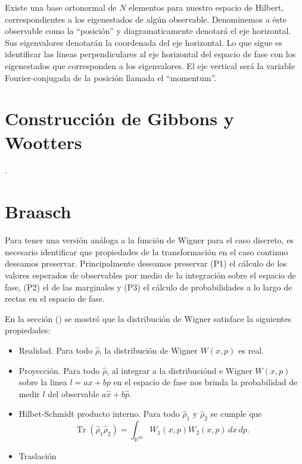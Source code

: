 \documentclass[a4paper]{report}
\DeclareMathOperator{\R}{\mathbb{R}}
\DeclareMathOperator{\Tr}{Tr}
\begin{document}
  Existe una base ortonormal de $N$ elementos para nuestro
  espacio de Hilbert, correspondientes a los eigenestados de
  algún observable. Denominemos a éste observable como la
  ``posición'' y diagramaticamente denotará el eje
  horizontal. Sus eigenvalores denotarán la coordenada del
  eje horizontal. Lo que sigue es identificar las lineas
  perpendiculares al eje horizontal del espacio de fase con
  los eigenestados que corresponden a los eigenvalores. El
  eje vertical será la variable Fourier-conjugada de la
  posición llamada el ``momentum''.

  \section{Construcción de Gibbons y Wootters}

  .

  \section{Braasch}

  Para tener una versión análoga a la función de Wigner para
  el caso discreto, es necesario identificar que propiedades
  de la transformación en el caso continuo deseamos
  preservar.  Principalmente deseamos preservar (P1) el
  cálculo de los valores esperados de observables por medio
  de la integración sobre el espacio de fase, (P2) el de las
  marginales y (P3) el cálculo de probabilidades a lo largo
  de rectas en el espacio de fase.

  En la sección () se mostró que la distribución de Wigner
  satisface la siguientes propiedades:
  \begin{itemize}
    \item Realidad. Para todo $\hat{\rho}$, la distribución
      de Wigner $W(x,p)$ es real.
    \item Proyección. Para todo $\hat{\rho}$, al integrar a
      la distribuciónd e Wigner $W(x,p)$ sobre la linea $l =
      ax + bp$ en el espacio de fase nos brinda la
      probabilidad de medir $l$ del observable $a \hat{x} +
      b \hat{p}$.
    \item Hilbet-Schmidt producto interno. Para todo
      $\hat{\rho}_1$  y $\hat{\rho}_2$ se cumple que
      \[
        \Tr\left(\hat{\rho}_1 \hat{\rho}_2\right)
        = \int_{\R^{2n}} W_1(x,p) W_2(x,p) \, dx \, dp.
      \] 
    \item Traslación
  \end{itemize}
\end{document}
